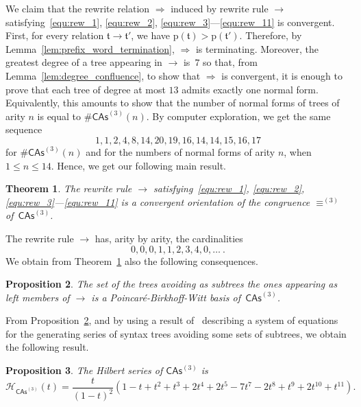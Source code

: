 \documentclass[10pt,reqno]{amsart}
\numberwithin{equation}{subsection}
\newtheorem{Theorem}{Theorem}[subsection]
\newtheorem{Proposition}[Theorem]{Proposition}
\renewcommand{\leq}{\leqslant}
\newcommand{\Tfr}{\mathfrak{t}}
\newcommand{\HilbertSeries}{\mathcal{H}}
\newcommand{\CAs}[1]{\mathsf{CAs}^{(#1)}}
\newcommand{\PrefixWord}{\mathrm{p}}
\DeclareMathOperator{\Congr}{\equiv}
\DeclareMathOperator{\Rew}{\to}
\DeclareMathOperator{\RewContext}{\Rightarrow}
\newcommand{\CongrCAs}[1]{\Congr^{(#1)}}
\begin{document}
\noindent
We claim that the rewrite relation $\RewContext$ induced by
rewrite rule $\Rew$ satisfying~\eqref{equ:rew_1}, \eqref{equ:rew_2},
\eqref{equ:rew_3}---\eqref{equ:rew_11} is convergent. First, for every
relation $\Tfr \Rew \Tfr'$, we have
$\PrefixWord(\Tfr) > \PrefixWord(\Tfr')$. Therefore, by
Lemma~\ref{lem:prefix_word_termination}, $\RewContext$ is terminating.
Moreover, the greatest degree of a tree appearing in $\Rew$ is~$7$ so
that, from Lemma~\ref{lem:degree_confluence}, to show that $\RewContext$
is convergent, it is enough to prove that each tree of degree at most
$13$ admits exactly one normal form. Equivalently, this amounts to
show that the number of normal forms of trees of arity $n$ is equal
to $\#\CAs{3}(n)$. By computer exploration, we get the same sequence
\begin{equation} \label{equ:dimensions_CAs_3}
    1, 1, 2, 4, 8, 14, 20, 19, 16, 14, 14, 15, 16, 17
\end{equation}
for $\#\CAs{3}(n)$ and for the numbers of normal forms of arity $n$,
when $ 1 \leq n \leq 14$. Hence, we get our following main result.
\medbreak

\begin{Theorem} \label{thm:convergent_rewrite_rule_CAs_3}
    The rewrite rule $\Rew$ satisfying~\eqref{equ:rew_1},
    \eqref{equ:rew_2}, \eqref{equ:rew_3}---\eqref{equ:rew_11} is a
    convergent orientation of the congruence $\CongrCAs{3}$
    of~$\CAs{3}$.
\end{Theorem}
\medbreak

The rewrite rule $\Rew$ has, arity by arity, the cardinalities
\begin{equation}
    0, 0, 0, 1, 1, 2, 3, 4, 0, \dots~.
\end{equation}
We obtain from Theorem~\ref{thm:convergent_rewrite_rule_CAs_3} also
the following consequences.
\medbreak

\begin{Proposition} \label{prop:PBW_basis_CAs_3}
    The set of the trees avoiding as subtrees the ones appearing as
    left members of $\Rew$ is a Poincaré-Birkhoff-Witt basis
    of~$\CAs{3}$.
\end{Proposition}
\medbreak

From Proposition~\ref{prop:PBW_basis_CAs_3}, and by using a result
of~\cite{Gir18} describing a system of equations for the generating
series of syntax trees avoiding some sets of subtrees, we obtain the
following result.
\medbreak

\begin{Proposition} \label{prop:Hilbert_series_CAs_3}
    The Hilbert series of $\CAs{3}$ is
    \begin{equation} \label{equ:Hilbert_series_CAs_3}
        \HilbertSeries_{\CAs{3}}(t) = \frac{t}{(1 - t)^2}
        \left(1 - t + t^2 + t^3 + 2t^4 + 2t^5 - 7t^7 - 2t^8 + t^9 +
        2t^{10} + t^{11}\right).
    \end{equation}
\end{Proposition}
\medbreak
\end{document}
